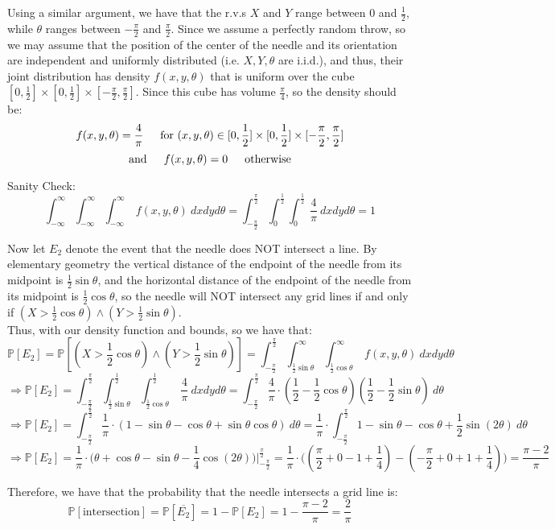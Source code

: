 \documentclass{article}
\begin{document}
Using a similar argument, we have that the r.v.s $X$ and $Y$ range between 0 and $\frac{1}{2}$, while $\theta$ ranges between $-\frac{\pi}{2}$ and $\frac{\pi}{2}$. Since we assume a perfectly random throw, so we may assume that the position of the center of the needle and its orientation are independent and uniformly distributed (i.e. $X,Y,\theta$ are i.i.d.), and thus,
their joint distribution has density $f(x,y,\theta)$ that is uniform over the cube $[0,\frac{1}{2}] \times [0,\frac{1}{2}] \times [-\frac{\pi}{2}, \frac{\pi}{2}]$. Since this cube has volume $\frac{\pi}{4}$, so the density should be:
$$f(x,y,\theta) = \frac{4}{\pi} \indent \text{for } (x,y,\theta)\in [0,\frac{1}{2}] \times [0,\frac{1}{2}] \times [-\frac{\pi}{2}, \frac{\pi}{2}]$$
$$\text{and}\indent f(x,y,\theta) = 0 \indent \text{otherwise}$$

Sanity Check:
$$\int_{-\infty}^\infty
	\int_{-\infty}^\infty
		\int_{-\infty}^\infty\ f(x,y,\theta)\ dxdyd\theta =
\int_{-\frac{\pi}{2}}^\frac{\pi}{2}
	\int_{0}^\frac{1}{2}
		\int_{0}^\frac{1}{2}\ \frac{4}{\pi}\ dxdyd\theta = 1
$$

Now let $E_2$ denote the event that the needle does NOT intersect a line. By elementary geometry the vertical distance of the endpoint of the needle from its midpoint is $\frac{1}{2}\sin\theta$, and the horizontal distance of the endpoint of the needle from its midpoint is $\frac{1}{2}\cos\theta$, so the needle will NOT intersect any grid lines if and only if $(X > \frac{1}{2}\cos\theta) \land (Y > \frac{1}{2}\sin\theta)$. \\

Thus, with our density function and bounds, so we have that:
$$\mathbb{P}[E_2] =
\mathbb{P}[(X > \frac{1}{2}\cos\theta) \land (Y > \frac{1}{2}\sin\theta)] =
\int_{-\frac{\pi}{2}}^\frac{\pi}{2}
	\int_{\frac{1}{2}\sin\theta}^\infty
		\int_{\frac{1}{2}\cos\theta}^\infty\
			f(x,y,\theta)\ dxdyd\theta$$
$$\Longrightarrow \mathbb{P}[E_2] =
\int_{-\frac{\pi}{2}}^\frac{\pi}{2}
	\int_{\frac{1}{2}\sin\theta}^\frac{1}{2}
		\int_{\frac{1}{2}\cos\theta}^\frac{1}{2}\
			\frac{4}{\pi}\ dxdyd\theta =
\int_{-\frac{\pi}{2}}^\frac{\pi}{2}
	\frac{4}{\pi}\cdot
		(\frac{1}{2} - \frac{1}{2}\cos\theta)
		(\frac{1}{2} - \frac{1}{2}\sin\theta)\ d\theta$$
$$\Longrightarrow \mathbb{P}[E_2] =
\int_{-\frac{\pi}{2}}^\frac{\pi}{2}
	\frac{1}{\pi}\cdot(1 - \sin\theta - \cos\theta + \sin\theta\cos\theta)\ d\theta =
\frac{1}{\pi}\cdot \int_{-\frac{\pi}{2}}^\frac{\pi}{2}
	1 - \sin\theta - \cos\theta + \frac{1}{2}\sin(2\theta)\ d\theta$$
$$\Longrightarrow \mathbb{P}[E_2] =
\frac{1}{\pi}\cdot
	\big(\theta + \cos\theta - \sin\theta - \frac{1}{4}\cos(2\theta)\big)	\Big|_{-\frac{\pi}{2}}^\frac{\pi}{2} =
\frac{1}{\pi}\cdot
	\Big(
		(\frac{\pi}{2} + 0 - 1 + \frac{1}{4}) -
		(-\frac{\pi}{2} + 0 + 1 + \frac{1}{4})
	\Big) =
\frac{\pi-2}{\pi}$$

Therefore, we have that the probability that the needle intersects a grid line is:
$$\mathbb{P}[\text{intersection}] =
\mathbb{P}[\overline{E_2}] =
1 - \mathbb{P}[E_2] = 1 - \frac{\pi-2}{\pi} = \frac{2}{\pi}$$
\end{document}

